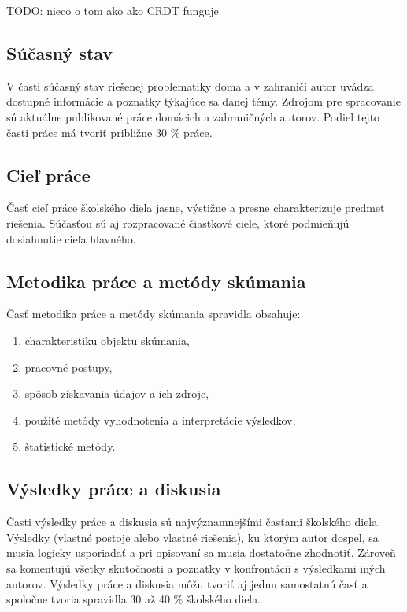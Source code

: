 TODO: nieco o tom ako ako CRDT funguje

\subsection{Súčasný stav}
V časti súčasný stav riešenej problematiky doma a v zahraničí autor uvádza 
dostupné informácie a poznatky týkajúce sa danej témy. Zdrojom pre spracovanie sú 
aktuálne publikované práce domácich a zahraničných autorov.  Podiel tejto časti práce 
má tvoriť približne 30 \% práce.

\subsection{Cieľ práce}
Časť cieľ práce  školského diela jasne, výstižne a presne charakterizuje predmet 
riešenia. Súčasťou sú aj rozpracované čiastkové ciele, ktoré podmieňujú dosiahnutie 
cieľa hlavného. 

\subsection{Metodika práce a metódy skúmania}
Časť metodika práce a metódy skúmania spravidla obsahuje:
\begin{enumerate}
\item  charakteristiku objektu skúmania,  
\item  pracovné postupy, 
\item  spôsob získavania údajov a ich zdroje, 
\item  použité metódy vyhodnotenia a interpretácie výsledkov,
\item  štatistické metódy.
\end{enumerate}

\subsection{Výsledky práce a diskusia}
Časti výsledky práce a diskusia sú najvýznamnejšími  časťami  školského diela. 
Výsledky (vlastné postoje alebo vlastné riešenia), ku ktorým autor dospel, sa musia 
logicky usporiadať a pri opisovaní sa musia dostatočne zhodnotiť. Zároveň sa 
komentujú všetky skutočnosti a poznatky v konfrontácii s výsledkami iných autorov. 
Výsledky práce a diskusia môžu tvoriť aj jednu samostatnú časť  a spoločne tvoria 
spravidla 30 až 40 \% školského diela.  
